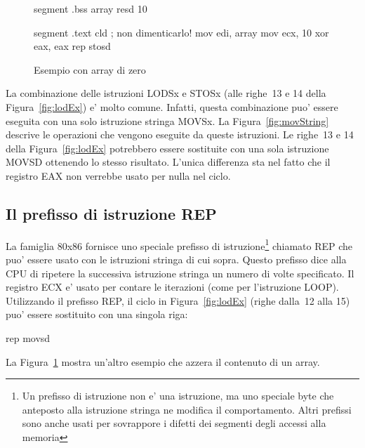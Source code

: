 \begin{figure}[t]
\begin{AsmCodeListing}[frame=single]
segment .bss
array  resd 10

segment .text
      cld                   ; non dimenticarlo!
      mov    edi, array
      mov    ecx, 10
      xor    eax, eax
      rep stosd
\end{AsmCodeListing}
\caption{Esempio con array di zero\label{fig:zeroArrayEx}}
\end{figure}

La combinazione delle istruzioni {\code LODSx} e {\code STOSx} (alle 
righe~13 e 14 della Figura~\ref{fig:lodEx}) e' molto comune. Infatti,
questa combinazione puo' essere eseguita con una solo istruzione stringa
{\code MOVSx}. La Figura~\ref{fig:movString} descrive le operazioni che 
vengono eseguite da queste istruzioni. Le righe~13 e 14 della Figura~\ref{fig:lodEx}
potrebbero essere sostituite con una sola istruzione {\code MOVSD} ottenendo
lo stesso risultato. L'unica differenza sta nel fatto che il registro 
EAX non verrebbe usato per nulla nel ciclo.

\subsection{Il prefisso di istruzione {\code REP}}

La famiglia 80x86 fornisce uno speciale prefisso di istruzione\footnote{
Un prefisso di istruzione non e' una istruzione, ma uno speciale byte
che anteposto alla istruzione stringa ne modifica il comportamento.
Altri prefissi sono anche usati per sovrappore i difetti dei segmenti
degli accessi alla memoria} chiamato {\code REP} che puo' essere usato con le
istruzioni stringa di cui sopra. Questo prefisso dice alla CPU di ripetere
la successiva istruzione stringa un numero di volte specificato. Il 
registro ECX e' usato per contare le iterazioni (come per l'istruzione
{\code LOOP}). Utilizzando il prefisso {\code REP}, il ciclo in 
Figura~\ref{fig:lodEx} (righe dalla~12 alla 15) puo' essere sostituito
con una singola riga:
\begin{AsmCodeListing}[frame=none, numbers=none]
      rep movsd
\end{AsmCodeListing}
La Figura~\ref{fig:zeroArrayEx} mostra un'altro esempio che azzera il 
contenuto di un array.

